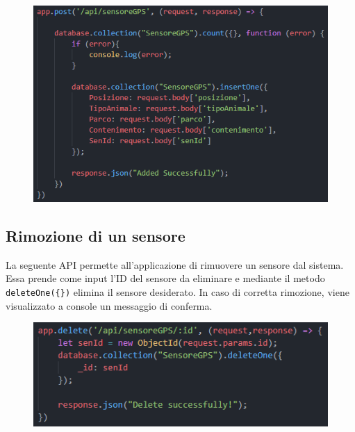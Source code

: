 \begin{figure}[ht]
    \centering
    \includegraphics{Img/postSensore.png}
    \label{fig:post_sensore}
\end{figure}

\subsection{Rimozione di un sensore}
La seguente API permette all'applicazione di rimuovere un sensore dal sistema. Essa prende come input l'ID del sensore da eliminare e mediante il metodo \texttt{deleteOne(\{\})} elimina il sensore desiderato. In caso di corretta rimozione, viene visualizzato a console un messaggio di conferma.

\begin{figure}[ht]
    \centering
    \includegraphics{Img/deleteSensore.png}
    \label{delete_sensore}
\end{figure}



